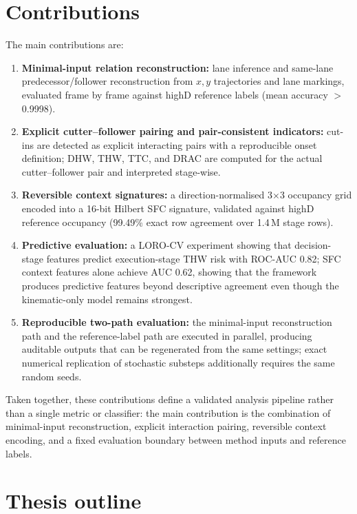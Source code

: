 \documentclass[12pt,a4paper,twoside,openright]{report}
\begin{document}
    \section{Contributions}
    The main contributions are:

    \begin{enumerate}[leftmargin=1.6em]
  \item \textbf{Minimal-input relation reconstruction:} lane inference and same-lane predecessor/follower reconstruction from $x,y$ trajectories and lane markings, evaluated frame by frame against highD reference labels (mean accuracy $>$0.9998).
  \item \textbf{Explicit cutter--follower pairing and pair-consistent indicators:} cut-ins are detected as explicit interacting pairs with a reproducible onset definition; DHW, THW, TTC, and DRAC are computed for the actual cutter--follower pair and interpreted stage-wise.
  \item \textbf{Reversible context signatures:} a direction-normalised 3$\times$3 occupancy grid encoded into a 16-bit Hilbert SFC signature, validated against highD reference occupancy (99.49\% exact row agreement over 1.4\,M stage rows).
  \item \textbf{Predictive evaluation:} a LORO-CV experiment showing that decision-stage features predict execution-stage THW risk with ROC-AUC 0.82; SFC context features alone achieve AUC 0.62, showing that the framework produces predictive features beyond descriptive agreement even though the kinematic-only model remains strongest.
  \item \textbf{Reproducible two-path evaluation:} the minimal-input reconstruction path and the reference-label path are executed in parallel, producing auditable outputs that can be regenerated from the same settings; exact numerical replication of stochastic substeps additionally requires the same random seeds.
    \end{enumerate}

    Taken together, these contributions define a validated analysis pipeline rather than a single metric or classifier: the main contribution is the combination of minimal-input reconstruction, explicit interaction pairing, reversible context encoding, and a fixed evaluation boundary between method inputs and reference labels.

    \section{Thesis outline}
\end{document}
